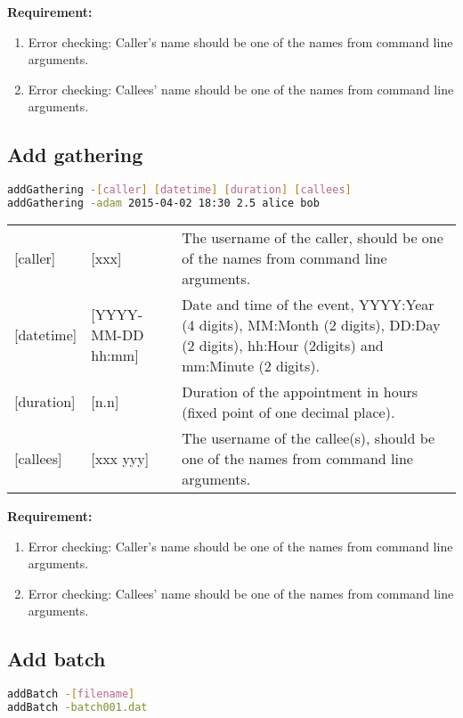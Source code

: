 \documentclass[12pt,a4paper]{report}
\begin{document}
\textbf{Requirement:}
\begin{enumerate}
\item Error checking: Caller's name should be one of the names from command line arguments.
\item Error checking: Callees' name should be one of the names from command line arguments.
\end{enumerate}

\subsection{Add gathering}
\begin{lstlisting}[language=bash,basicstyle=\ttfamily,keywordstyle=\bfseries]
addGathering -[caller] [datetime] [duration] [callees]
addGathering -adam 2015-04-02 18:30 2.5 alice bob
\end{lstlisting}

\begin{table}[h]
\begin{tabular}{lll}
{[}caller{]} & {[}xxx{]} & The username of the caller, should be one of the names from command line arguments. \\
{[}datetime{]} & {[}YYYY-MM-DD hh:mm{]} & \parbox[t]{15cm}{Date and time of the event, YYYY:Year (4 digits), MM:Month (2 digits), DD:Day (2 digits), hh:Hour (2digits) and mm:Minute (2 digits).} \\
{[}duration{]}  & {[}n.n{]} & Duration of the appointment in hours (fixed point of one decimal place). \\
{[}callees{]}  & {[}xxx yyy{]} & The username of the callee(s), should be one of the names from command line arguments.
\end{tabular}
\end{table}

\textbf{Requirement:}
\begin{enumerate}
\item Error checking: Caller's name should be one of the names from command line arguments.
\item Error checking: Callees' name should be one of the names from command line arguments.
\end{enumerate}

\subsection{Add batch}
\begin{lstlisting}[language=bash,basicstyle=\ttfamily,keywordstyle=\bfseries]
addBatch -[filename]
addBatch -batch001.dat
\end{lstlisting}
\end{document}

